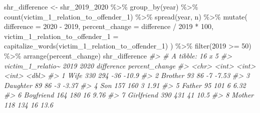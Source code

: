 \documentclass[
]{krantz}
\makeatletter
\newenvironment{Shaded}{\begin{snugshade}}{\end{snugshade}}
\newcommand{\AttributeTok}[1]{\textcolor[rgb]{0.61,0.61,0.61}{#1}}
\newcommand{\CommentTok}[1]{\textcolor[rgb]{0.37,0.37,0.37}{\textit{#1}}}
\newcommand{\DecValTok}[1]{\textcolor[rgb]{0.06,0.06,0.06}{#1}}
\newcommand{\FunctionTok}[1]{\textcolor[rgb]{0,0,0}{#1}}
\newcommand{\NormalTok}[1]{#1}
\newcommand{\OtherTok}[1]{\textcolor[rgb]{0.37,0.37,0.37}{#1}}
\newcommand{\SpecialCharTok}[1]{\textcolor[rgb]{0,0,0}{#1}}
\newcommand{\StringTok}[1]{\textcolor[rgb]{0.5,0.5,0.5}{#1}}
\newenvironment{kframe}{%
\medskip{}
\setlength{\fboxsep}{.8em}
 \def\at@end@of@kframe{}%
 \ifinner\ifhmode%
  \def\at@end@of@kframe{\end{minipage}}%
  \begin{minipage}{\columnwidth}%
 \fi\fi%
 \def\FrameCommand##1{\hskip\@totalleftmargin \hskip-\fboxsep
 \colorbox{shadecolor}{##1}\hskip-\fboxsep
     \hskip-\linewidth \hskip-\@totalleftmargin \hskip\columnwidth}%
 \MakeFramed {\advance\hsize-\width
   \@totalleftmargin\z@ \linewidth\hsize
   \@setminipage}}%
 {\par\unskip\endMakeFramed%
 \at@end@of@kframe}
\renewenvironment{Shaded}{\begin{kframe}}{\end{kframe}}
\makeatother
\begin{document}
\begin{Shaded}
\begin{Highlighting}[]
\NormalTok{shr\_difference }\OtherTok{\textless{}{-}}
\NormalTok{  shr\_2019\_2020 }\SpecialCharTok{\%\textgreater{}\%}
  \FunctionTok{group\_by}\NormalTok{(year) }\SpecialCharTok{\%\textgreater{}\%}
  \FunctionTok{count}\NormalTok{(victim\_1\_relation\_to\_offender\_1) }\SpecialCharTok{\%\textgreater{}\%}
  \FunctionTok{spread}\NormalTok{(year, n) }\SpecialCharTok{\%\textgreater{}\%}
  \FunctionTok{mutate}\NormalTok{(}
    \AttributeTok{difference =} \StringTok{\textasciigrave{}}\AttributeTok{2020}\StringTok{\textasciigrave{}} \SpecialCharTok{{-}} \StringTok{\textasciigrave{}}\AttributeTok{2019}\StringTok{\textasciigrave{}}\NormalTok{,}
    \AttributeTok{percent\_change =}\NormalTok{ difference }\SpecialCharTok{/} \StringTok{\textasciigrave{}}\AttributeTok{2019}\StringTok{\textasciigrave{}} \SpecialCharTok{*} \DecValTok{100}\NormalTok{,}
    \AttributeTok{victim\_1\_relation\_to\_offender\_1 =}
      \FunctionTok{capitalize\_words}\NormalTok{(victim\_1\_relation\_to\_offender\_1)}
\NormalTok{  ) }\SpecialCharTok{\%\textgreater{}\%}
  \FunctionTok{filter}\NormalTok{(}\StringTok{\textasciigrave{}}\AttributeTok{2019}\StringTok{\textasciigrave{}} \SpecialCharTok{\textgreater{}=} \DecValTok{50}\NormalTok{) }\SpecialCharTok{\%\textgreater{}\%}
  \FunctionTok{arrange}\NormalTok{(percent\_change)}
\NormalTok{shr\_difference}
\CommentTok{\#\textgreater{} \# A tibble: 16 x 5}
\CommentTok{\#\textgreater{}    victim\_1\_relatio\textasciitilde{} \textasciigrave{}2019\textasciigrave{} \textasciigrave{}2020\textasciigrave{} difference percent\_change}
\CommentTok{\#\textgreater{}    \textless{}chr\textgreater{}              \textless{}int\textgreater{}  \textless{}int\textgreater{}      \textless{}int\textgreater{}          \textless{}dbl\textgreater{}}
\CommentTok{\#\textgreater{}  1 Wife                 330    294        {-}36         {-}10.9 }
\CommentTok{\#\textgreater{}  2 Brother               93     86         {-}7          {-}7.53}
\CommentTok{\#\textgreater{}  3 Daughter              89     86         {-}3          {-}3.37}
\CommentTok{\#\textgreater{}  4 Son                  157    160          3           1.91}
\CommentTok{\#\textgreater{}  5 Father                95    101          6           6.32}
\CommentTok{\#\textgreater{}  6 Boyfriend            164    180         16           9.76}
\CommentTok{\#\textgreater{}  7 Girlfriend           390    431         41          10.5 }
\CommentTok{\#\textgreater{}  8 Mother               118    134         16          13.6 }

\end{Highlighting}
\end{Shaded}
\end{document}
